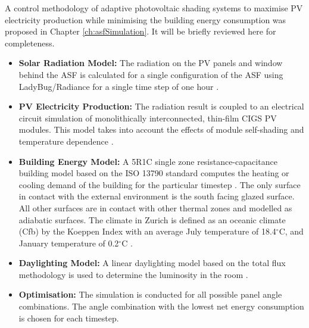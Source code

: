 
A control methodology of adaptive photovoltaic shading systems to maximise PV electricity production while minimising the building energy consumption was proposed in Chapter \ref{ch:asfSimulation}. It will be briefly reviewed here for completeness.

\begin{itemize}
\item \textbf{Solar Radiation Model:} The radiation on the PV panels and window behind the ASF is calculated for a single configuration of the ASF using LadyBug/Radiance for a single time step of one hour \cite{roudsari2013ladybug,ward1994radiance}.
\item \textbf{PV Electricity Production:} The radiation result is coupled to an electrical circuit simulation of monolithically interconnected, thin-film CIGS PV modules. This model takes into account the effects of module self-shading and temperature dependence \cite{hofer2016parametric}.
\item \textbf{Building Energy Model:} A 5R1C single zone resistance-capacitance building model based on the ISO 13790 standard computes the heating or cooling demand of the building for the particular timestep \cite{de2008iso}. The only surface in contact with the external environment is the south facing glazed surface. All other surfaces are in contact with other thermal zones and modelled as adiabatic surfaces. The climate in Zurich is defined as an oceanic climate (Cfb) by the Koeppen Index with an average July temperature of 18.4$^{\circ}$C, and January temperature of 0.2$^{\circ}$C \cite{koppenZurich}.
\item \textbf{Daylighting Model:} A linear daylighting model based on the total flux methodology is used to determine the luminosity in the room \cite{szokolay1980handbook}. 
\item \textbf{Optimisation:} The simulation is conducted for all possible panel angle combinations. The angle combination with the lowest net energy consumption is chosen for each timestep.
\end{itemize}




